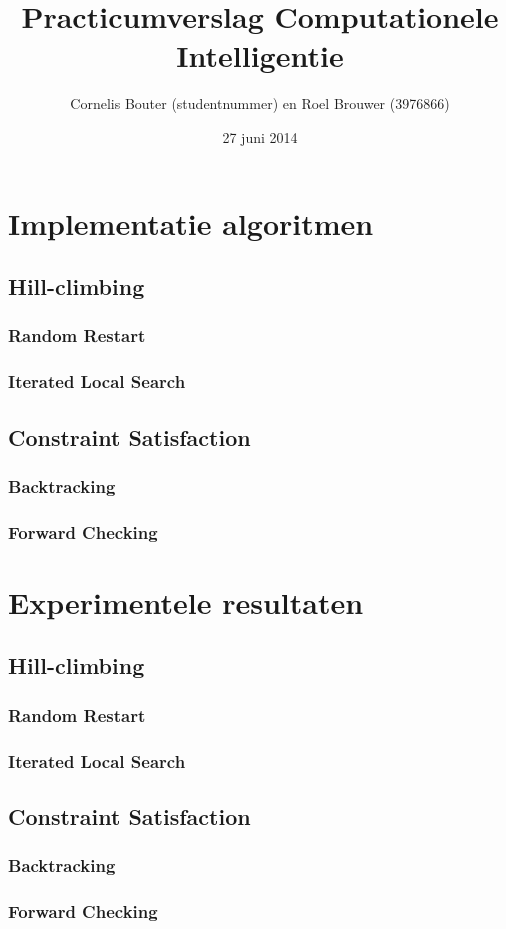 \documentclass[]{report}
\title{Practicumverslag Computationele Intelligentie}
\author{Cornelis Bouter (studentnummer) en Roel Brouwer (3976866)}
\date{27 juni 2014}
\begin{document}
\maketitle

\begin{abstract}
\end{abstract}


\chapter{Implementatie algoritmen}
\section{Hill-climbing}
\subsection{Random Restart}
\subsection{Iterated Local Search}
\section{Constraint Satisfaction}
\subsection{Backtracking}
\subsection{Forward Checking}

\chapter{Experimentele resultaten}
\section{Hill-climbing}
\subsection{Random Restart}
\subsection{Iterated Local Search}
\section{Constraint Satisfaction}
\subsection{Backtracking}
\subsection{Forward Checking}
\end{document}
